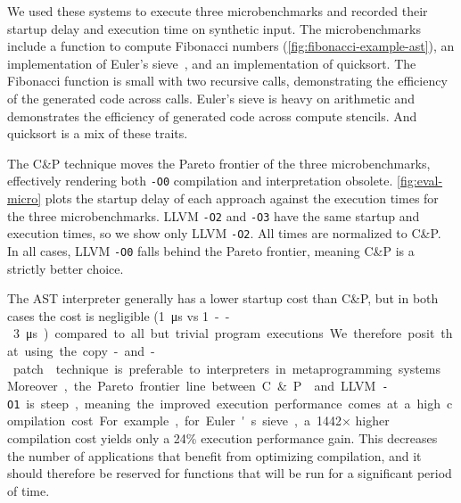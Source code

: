 \documentclass[acmsmall,nonacm,screen]{acmart}\settopmatter{printfolios=true,printccs=true,printacmref=false}
\newcommand{\figref}[1]{\autoref{#1}}
\newcommand\code[1]{\lstinline[mathescape=true,basicstyle=\ttfamily\normalsize]|#1|}
\newcommand{\ozero}{\texttt{-O0}}
\newcommand{\otwo}{\texttt{-O2}}
\newcommand{\othree}{\texttt{-O3}}
\newcommand{\cp}{copy-and-patch}
\newcommand{\cpshort}{C\&P}
\newcommand{\X}{$\times$}
\begin{document}
We used these systems to execute three microbenchmarks and recorded their startup delay and execution time on synthetic input. The microbenchmarks include a function to compute Fibonacci numbers (\figref{fig:fibonacci-example-ast}), an implementation of Euler's sieve~\cite{euler_sieve}, and an implementation of quicksort. The Fibonacci function is small with two recursive calls, demonstrating the efficiency of the generated code across calls. Euler's sieve is heavy on arithmetic and demonstrates the efficiency of generated code across compute stencils. And quicksort is a mix of these traits.

The \cpshort{} technique moves the Pareto frontier of the three microbenchmarks, effectively rendering both \ozero{} compilation and interpretation obsolete. \figref{fig:eval-micro} plots the startup delay of each approach against the execution times for the three microbenchmarks. LLVM \otwo{} and \othree{} have the same startup and execution times, so we show only LLVM \otwo{}. All times are normalized to \cpshort{}. In all cases, LLVM \ozero{} falls behind the Pareto frontier, meaning \cpshort{} is a strictly better choice.

The AST interpreter generally has a lower startup cost than \cpshort{}, but in both cases the cost is negligible (\SI{1}{\micro\second} vs \SI{1}--\SI{3}{\micro\second}) compared to all but trivial program executions. We therefore posit that using the \cp{} technique is preferable to interpreters in metaprogramming systems. Moreover, the Pareto frontier line between \cpshort{} and LLVM \code{-O1} is steep, meaning the improved execution performance comes at a high compilation cost. For example, for Euler's sieve, a \num{1442}\X{} higher compilation cost yields only a 24\% execution performance gain. This decreases the number of applications that benefit from optimizing compilation, and it should therefore be reserved for functions that will be run for a significant period of time.
\end{document}
